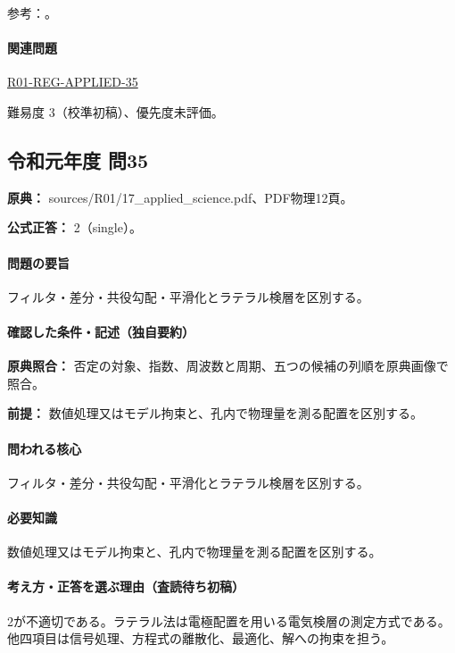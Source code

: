 \par 参考：\cite{pygimli_inversion,mit_roy_fea1999}。

\paragraph{関連問題} \hyperref[q:r01-reg-applied-35]{R01-REG-APPLIED-35}

\par 難易度 3（校準初稿）、優先度未評価。

\subsection{令和元年度 問35}
\label{q:r01-reg-applied-35}

\noindent\textbf{原典：} sources/R01/17\_applied\_science.pdf、PDF物理12頁。

\textbf{公式正答：} 2（single）。

\paragraph{問題の要旨} フィルタ・差分・共役勾配・平滑化とラテラル検層を区別する。

\paragraph{確認した条件・記述（独自要約）}\mbox{}\par

\noindent\textbf{原典照合：} 否定の対象、指数、周波数と周期、五つの候補の列順を原典画像で照合。\par

\noindent\textbf{前提：} 数値処理又はモデル拘束と、孔内で物理量を測る配置を区別する。\par

\paragraph{問われる核心} フィルタ・差分・共役勾配・平滑化とラテラル検層を区別する。

\paragraph{必要知識} 数値処理又はモデル拘束と、孔内で物理量を測る配置を区別する。

\paragraph{考え方・正答を選ぶ理由（査読待ち初稿）} 2が不適切である。ラテラル法は電極配置を用いる電気検層の測定方式である。他四項目は信号処理、方程式の離散化、最適化、解への拘束を担う。

